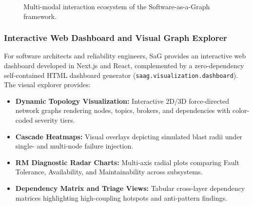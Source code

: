 \begin{figure}[htbp]
\caption{Multi-modal interaction ecosystem of the Software-as-a-Graph framework.}
\label{fig:tool_interfaces}
\end{figure}

\subsubsection{Interactive Web Dashboard and Visual Graph Explorer}
For software architects and reliability engineers, SaG provides an interactive web dashboard developed in Next.js and React, complemented by a zero-dependency self-contained HTML dashboard generator (\texttt{saag.visualization.dashboard}). The visual explorer provides:
\begin{itemize}
    \item \textbf{Dynamic Topology Visualization:} Interactive 2D/3D force-directed network graphs rendering nodes, topics, brokers, and dependencies with color-coded severity tiers.
    \item \textbf{Cascade Heatmaps:} Visual overlays depicting simulated blast radii under single- and multi-node failure injection.
    \item \textbf{RM Diagnostic Radar Charts:} Multi-axis radial plots comparing Fault Tolerance, Availability, and Maintainability across subsystems.
    \item \textbf{Dependency Matrix and Triage Views:} Tabular cross-layer dependency matrices highlighting high-coupling hotspots and anti-pattern findings.
\end{itemize}

